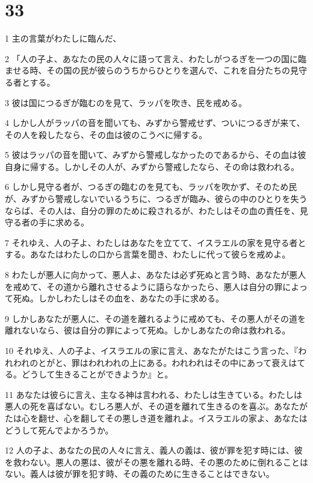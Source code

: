 \chapter{33}

\par 1 主の言葉がわたしに臨んだ、
\par 2 「人の子よ、あなたの民の人々に語って言え、わたしがつるぎを一つの国に臨ませる時、その国の民が彼らのうちからひとりを選んで、これを自分たちの見守る者とする。
\par 3 彼は国につるぎが臨むのを見て、ラッパを吹き、民を戒める。
\par 4 しかし人がラッパの音を聞いても、みずから警戒せず、ついにつるぎが来て、その人を殺したなら、その血は彼のこうべに帰する。
\par 5 彼はラッパの音を聞いて、みずから警戒しなかったのであるから、その血は彼自身に帰する。しかしその人が、みずから警戒したなら、その命は救われる。
\par 6 しかし見守る者が、つるぎの臨むのを見ても、ラッパを吹かず、そのため民が、みずから警戒しないでいるうちに、つるぎが臨み、彼らの中のひとりを失うならば、その人は、自分の罪のために殺されるが、わたしはその血の責任を、見守る者の手に求める。
\par 7 それゆえ、人の子よ、わたしはあなたを立てて、イスラエルの家を見守る者とする。あなたはわたしの口から言葉を聞き、わたしに代って彼らを戒めよ。
\par 8 わたしが悪人に向かって、悪人よ、あなたは必ず死ぬと言う時、あなたが悪人を戒めて、その道から離れさせるように語らなかったら、悪人は自分の罪によって死ぬ。しかしわたしはその血を、あなたの手に求める。
\par 9 しかしあなたが悪人に、その道を離れるように戒めても、その悪人がその道を離れないなら、彼は自分の罪によって死ぬ。しかしあなたの命は救われる。
\par 10 それゆえ、人の子よ、イスラエルの家に言え、あなたがたはこう言った、『われわれのとがと、罪はわれわれの上にある。われわれはその中にあって衰えはてる。どうして生きることができようか』と。
\par 11 あなたは彼らに言え、主なる神は言われる、わたしは生きている。わたしは悪人の死を喜ばない。むしろ悪人が、その道を離れて生きるのを喜ぶ。あなたがたは心を翻せ、心を翻してその悪しき道を離れよ。イスラエルの家よ、あなたはどうして死んでよかろうか。
\par 12 人の子よ、あなたの民の人々に言え、義人の義は、彼が罪を犯す時には、彼を救わない。悪人の悪は、彼がその悪を離れる時、その悪のために倒れることはない。義人は彼が罪を犯す時、その義のために生きることはできない。
